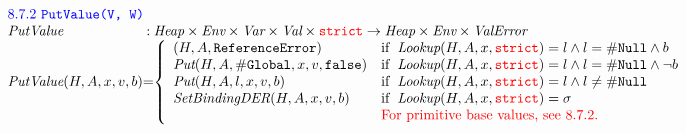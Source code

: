 \[\begin{array}{l@{}c@{}l}

\multicolumn{3}{l}{\mbox{\inblue 8.7.2 {\tt PutValue(V, W)}}}\\
\hf{PutValue} & :& \Heap \times \Env \times \Var \times \Val \times \strict
\rightarrow \Heap \times \Env \times \ve\\
\hf{PutValue}(H,A,x,v,b) &=&
\left\{\begin{array}{ll}
(H,A,\re)
&\ifc{\hf{Lookup}(H,A,x,\strict) = l \wedge l = \nullL \wedge b}\\
\hf{Put}(H,A,\lg,x,v,\false)
&\ifc{\hf{Lookup}(H,A,x,\strict) = l \wedge l = \nullL \wedge \neg b}\\

\hf{Put}(H,A,l,x,v,b)
&\ifc{\hf{Lookup}(H,A,x,\strict) = l  \wedge l \not= \nullL }\\ %
\hf{SetBindingDER}(H,A,x,v,b)
&\ifc{\hf{Lookup}(H,A,x,\strict) = \er}\\
& \mbox{\inred For primitive base values, see 8.7.2.}\\
\end{array}\right.
\\\\



\end{array}\]
